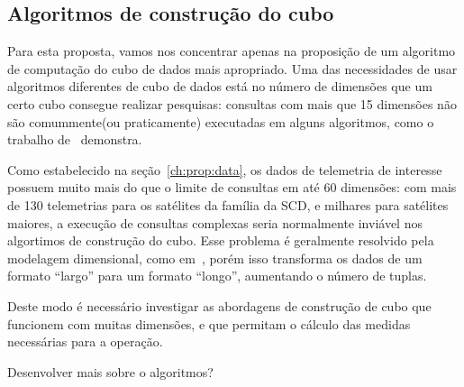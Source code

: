 \subsection{Algoritmos de construção do cubo}\label{ch:prop:cubearch:algo}

{\color{red}
Para esta proposta, vamos nos concentrar apenas na proposição de um algoritmo de computação do cubo de dados mais apropriado.
Uma das necessidades de usar algoritmos diferentes de cubo de dados está no número de dimensões que um certo cubo consegue realizar pesquisas: consultas com mais que 15 dimensões não são comummente(ou praticamente) executadas em alguns algoritmos, como o trabalho de~\cite{silva:2015:abordagensParaCubo} demonstra.

Como estabelecido na seção~\ref{ch:prop:data}, os dados de telemetria de interesse possuem muito mais do que o limite de consultas em até 60 dimensões: com mais de 130 telemetrias para os satélites da família da SCD, e milhares para satélites maiores, a execução de consultas complexas seria normalmente inviável nos algortimos de construção do cubo.
Esse problema é geralmente resolvido pela modelagem dimensional, como em~\cite{AzevedoAmbr:2010:ArSaTe}, porém isso transforma os dados de um formato ``largo'' para um formato ``longo'', aumentando o número de tuplas.

Deste modo é necessário investigar as abordagens de construção de cubo que funcionem com muitas dimensões, e que permitam o cálculo das medidas necessárias para a operação.

{\color{red} Desenvolver mais sobre o algoritmos?}

}

